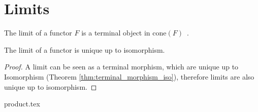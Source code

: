 \section{Limits}

\begin{definition}[Limit]

	The limit of a functor $F$ is a terminal object in
	$\mathrm{cone}(F)$~\parencite[p.~118]{leinster:basic_category_theory}.
\end{definition}

\begin{theorem}\label{thm:limit_iso}
	The limit of a functor is unique up to isomorphism.

	\begin{proof}
		A limit can be seen as a terminal morphism, which are unique up to
		Isomorphism (Theorem \ref{thm:terminal_morphism_iso}), therefore limits are
		also unique up to isomorphism.
	\end{proof}
\end{theorem}

\newpage

{product.tex}



